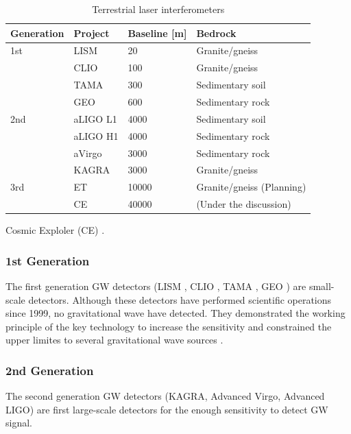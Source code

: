 \begin{table}[h] 
  \begin{center}
    \caption{Terrestrial laser interferometers \cite{chen2017brief,beker2013low}}\label{tb:tb101}
    \begin{tabular}{llll} 
      \hline
      Generation &Project & Baseline [m] & Bedrock \\ \hline \hline
      1st &LISM  & 20    & Granite/gneiss \\ 
      &CLIO  & 100   & Granite/gneiss \\
      &TAMA  & 300   & Sedimentary soil \cite{1970449}\\ 
      &GEO   & 600   & Sedimentary rock \\ \hline
      2nd &aLIGO L1 & 4000  & Sedimentary soil \\
      &aLIGO H1 & 4000  & Sedimentary rock \\
      &aVirgo   & 3000  & Sedimentary rock \\
      &KAGRA   & 3000  & Granite/gneiss \\ \hline
      3rd &ET      & 10000 & Granite/gneiss (Planning) \\
          &CE      & 40000 & (Under the discussion) \\
      \hline
    \end{tabular}
  \end{center}
\end{table}
Cosmic Exploler (CE) \cite{abbott2017exploring}.

\subsubsection{1st Generation}
The first generation GW detectors (LISM \cite{sato2004ultrastable}, CLIO \cite{ohashi2003design}, TAMA \cite{ando2001stable}, GEO \cite{grote2010geo}) are small-scale detectors. Although these detectors have performed scientific operations since 1999, no gravitational wave have detected. They demonstrated the working principle of the key technology to increase the sensitivity and constrained the upper limites to several gravitational wave sources \cite{takahashi2004coincidence,Fairhurst2011}.

\subsubsection{2nd Generation}
The second generation GW detectors (KAGRA\cite{akutsu2018kagra}, Advanced Virgo\cite{acernese2014advanced}, Advanced LIGO\cite{aasi2015advanced}) are first large-scale detectors for the enough sensitivity to detect GW signal.

